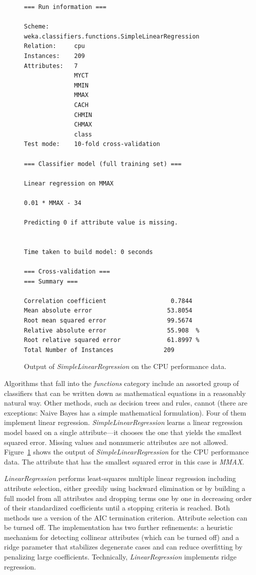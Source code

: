 \begin{figure}[!hp]
\begin{mdframed}[innermargin=-1.5cm]
\begin{Verbatim}[fontsize=\footnotesize]
=== Run information ===

Scheme:       weka.classifiers.functions.SimpleLinearRegression 
Relation:     cpu
Instances:    209
Attributes:   7
              MYCT
              MMIN
              MMAX
              CACH
              CHMIN
              CHMAX
              class
Test mode:    10-fold cross-validation

=== Classifier model (full training set) ===

Linear regression on MMAX

0.01 * MMAX - 34

Predicting 0 if attribute value is missing.


Time taken to build model: 0 seconds

=== Cross-validation ===
=== Summary ===

Correlation coefficient                  0.7844
Mean absolute error                     53.8054
Root mean squared error                 99.5674
Relative absolute error                 55.908  %
Root relative squared error             61.8997 %
Total Number of Instances              209 
\end{Verbatim}
\end{mdframed}
\caption{\label{fig:simple_linear_regression_output}Output of \textit{SimpleLinearRegression} on the CPU performance data.}
\end{figure}

Algorithms that fall into the \textit{functions} category include an
assorted group of classifiers that can be written down as mathematical
equations in a reasonably natural way. Other methods, such as decision
trees and rules, cannot (there are exceptions: Naive Bayes has a
simple mathematical formulation). Four of them implement linear
regression. \textit{SimpleLinearRegression} learns a linear regression
model based on a single attribute---it chooses the one that yields the
smallest squared error. Missing values and nonnumeric attributes are
not allowed. Figure~\ref{fig:simple_linear_regression_output} shows
the output of \textit{SimpleLinearRegression} for the CPU performance
data. The attribute that has the smallest squared error in this case
is \textit{MMAX}.

\textit{LinearRegression} performs least-squares multiple
linear regression including attribute selection,
either greedily using backward elimination or by building a full model
from all attributes and dropping terms one by one in decreasing order
of their standardized coefficients until a stopping criteria is
reached. Both methods use a version of the AIC termination
criterion. Attribute selection can be turned off. The implementation has two further refinements: a heuristic
mechanism for detecting collinear attributes (which can be turned off)
and a ridge parameter that stabilizes degenerate cases and can reduce
overfitting by penalizing large coefficients. Technically,
\textit{LinearRegression} implements ridge regression.

